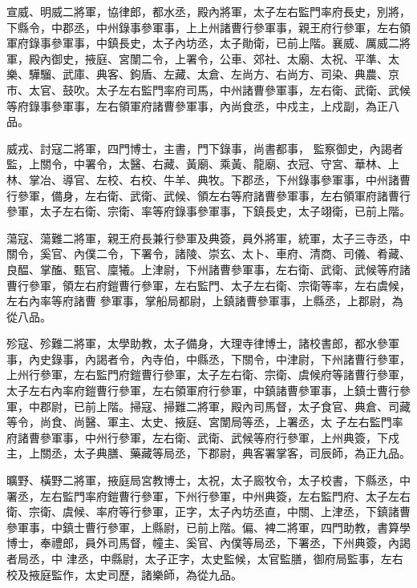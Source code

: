 \begin{pinyinscope}
 宣威、明威二將軍，協律郎，都水丞，殿內將軍，太子左右監門率府長史，別將，下縣令，中郡丞，中州錄事參軍事，上上州諸曹行參軍事，親王府行參軍，左右領軍府錄事參軍事，中鎮長史，太子內坊丞，太子勛衛，已前上階。襄威、厲威二將軍，殿內御史，掖庭、宮闈二令，上署令，公車、郊社、太廟、太祝、平準、太樂、驊騮、武庫、典客、鉤盾、左藏、太倉、左尚方、右尚方、司染、典農、京市、太官、鼓吹。太子左右監門率府司馬，中州諸曹參軍事，左右衛、武衛、武候等府錄事參軍事，左右領軍府諸曹參軍事，內尚食丞，中戍主，上戍副，為正八品。



 威戎、討寇二將軍，四門博士，主書，門下錄事，尚書都事，
 監察御史，內謁者監，上關令，中署令，太醫、右藏、黃廟、乘黃、龍廟、衣冠、守宮、華林、上林、掌冶、導官、左校、右校、牛羊、典牧。下郡丞，下州錄事參軍事，中州諸曹行參軍，備身，左右衛、武衛、武候、領左右等府諸曹參軍事，左右領軍府諸曹行參軍，太子左右衛、宗衛、率等府錄事參軍事，下鎮長史，太子翊衛，已前上階。



 蕩寇、蕩難二將軍，親王府長兼行參軍及典簽，員外將軍，統軍，太子三寺丞，中關令，奚官、內僕二令，下署令，諸陵、崇玄、太卜、車府、清商、司儀、肴藏、良醖、掌醢、甄官、廩犧。上津尉，下州諸曹參軍事，左右衛、武衛、武候等府諸曹行參軍，領左右府鎧曹行參軍，左右監門、太子左右衛、宗衛等率，左右虞候，左右內率等府諸曹
 參軍事，掌船局都尉，上鎮諸曹參軍事，上縣丞，上郡尉，為從八品。



 殄寇、殄難二將軍，太學助教，太子備身，大理寺律博士，諸校書郎，都水參軍事，內史錄事，內謁者令，內寺伯，中縣丞，下關令，中津尉，下州諸曹行參軍，上州行參軍，左右監門府鎧曹行參軍，太子左右衛、宗衛、虞候府等諸曹行參軍，太子左右內率府鎧曹行參軍，左右領軍府行參軍，中鎮諸曹參軍事，上鎮士曹行參軍，中郡尉，已前上階。掃寇、掃難二將軍，殿內司馬督，太子食官、典倉、司藏等令，尚食、尚醫、軍主、太史、掖庭、宮闈局等丞，上署丞，太
 子左右監門率府諸曹參軍事，中州行參軍，左右衛、武衛、武候等府行參軍，上州典簽，下戍主，上關丞，太子典膳、藥藏等局丞，下郡尉，典客署掌客，司辰師，為正九品。



 曠野、橫野二將軍，掖庭局宮教博士，太祝，太子廄牧令，太子校書，下縣丞，中署丞，左右監門率府鎧曹行參軍，下州行參軍，中州典簽，左右監門府、太子左右衛、宗衛、虞候、率府等行參軍，正字，太子內坊丞直，中關、上津丞，下鎮諸曹參軍事，中鎮士曹行參軍，上縣尉，已前上階。偏、裨二將軍，四門助教，書算學博士，奉禮郎，員外司馬督，幢主、奚官、內僕等局丞，下署丞，下州典簽，內謁者局丞，中
 津丞，中縣尉，太子正字，太史監候，太官監膳，御府局監事，左右校及掖庭監作，太史司歷，諸樂師，為從九品。




\end{pinyinscope}
